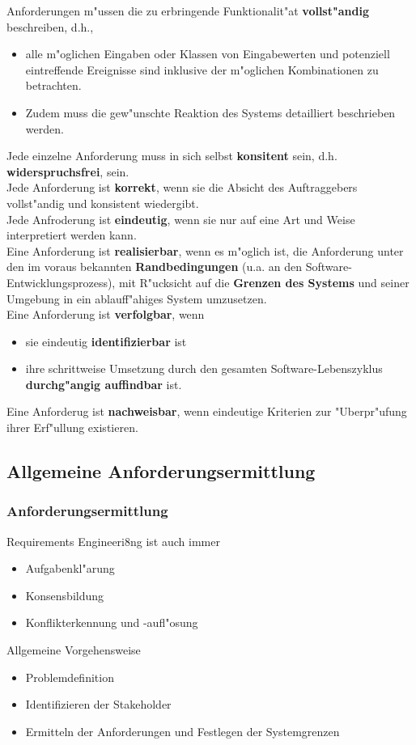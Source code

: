 Anforderungen m"ussen die zu erbringende Funktionalit"at \textbf{vollst"andig} beschreiben, d.h., 
\begin{itemize}
    \item alle m"oglichen Eingaben oder Klassen von Eingabewerten und potenziell eintreffende Ereignisse sind inklusive der m"oglichen Kombinationen zu betrachten.
    \item Zudem muss die gew"unschte Reaktion des Systems detailliert beschrieben werden.
\end{itemize}

Jede einzelne Anforderung muss in sich selbst \textbf{konsitent} sein, d.h. \textbf{widerspruchsfrei}, sein.\\
Jede Anforderung ist \textbf{korrekt}, wenn sie die Absicht des Auftraggebers vollst"andig und konsistent wiedergibt.\\
Jede Anfroderung ist \textbf{eindeutig}, wenn sie nur auf eine Art und Weise interpretiert werden kann.\\
Eine Anforderung ist \textbf{realisierbar}, wenn es m"oglich ist, die Anforderung unter den im voraus bekannten \textbf{Randbedingungen} (u.a. an den Software-Entwicklungsprozess), mit R"ucksicht auf die \textbf{Grenzen des Systems} und seiner Umgebung in ein ablauff"ahiges System umzusetzen.\\
Eine Anforderung ist \textbf{verfolgbar}, wenn
\begin{itemize}
    \item sie eindeutig \textbf{identifizierbar} ist
    \item ihre schrittweise Umsetzung durch den gesamten Software-Lebenszyklus \textbf{durchg"angig auffindbar} ist.
\end{itemize}
Eine Anforderug ist \textbf{nachweisbar}, wenn eindeutige Kriterien zur "Uberpr"ufung ihrer Erf"ullung existieren.\\


\subsection{Allgemeine Anforderungsermittlung}

\subsubsection{Anforderungsermittlung}

Requirements Engineeri8ng ist auch immer
\begin{itemize}
    \item Aufgabenkl"arung
    \item Konsensbildung
    \item Konflikterkennung und -aufl"osung
\end{itemize}
Allgemeine Vorgehensweise
\begin{itemize}
    \item Problemdefinition
    \item Identifizieren der Stakeholder
    \item Ermitteln der Anforderungen und Festlegen der Systemgrenzen
\end{itemize}

